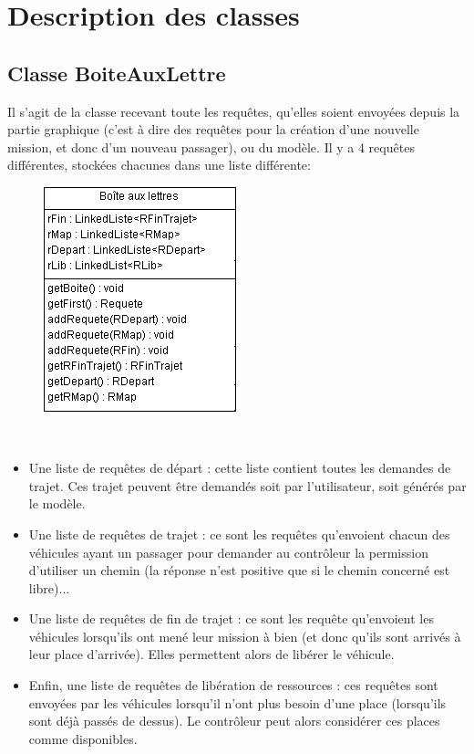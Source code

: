 \documentclass[a4paper, titlepage]{report}
\begin{document}
\chapter{Description des classes}
\section{Classe BoiteAuxLettre}
     
      Il s'agit de la classe recevant toute les requêtes, qu'elles soient envoyées depuis la partie graphique (c'est à dire des requêtes pour la création d'une nouvelle mission, et donc d'un nouveau passager), ou du modèle. Il y a 4 requêtes différentes, stockées chacunes dans une liste différente:
      \begin{figure}
\includegraphics[scale=1]{Images/boite.png}
\end{figure} \\  
      \begin{itemize}
      \item Une liste de requêtes de départ : cette liste contient toutes les demandes de trajet. Ces trajet peuvent être demandés soit par l'utilisateur, soit générés par le modèle.
      \item Une liste de requêtes de trajet : ce sont les requêtes qu'envoient chacun des véhicules ayant un passager pour demander au contrôleur la permission d'utiliser un chemin (la réponse n'est positive que si le chemin concerné est libre)...
      \item Une liste de requêtes de fin de trajet : ce sont les requête qu'envoient les véhicules lorsqu'ils ont mené leur mission à bien (et donc qu'ils sont arrivés à leur place d'arrivée). Elles permettent alors de libérer le véhicule.
      \item Enfin, une liste de requêtes de libération de ressources : ces requêtes sont envoyées par les véhicules lorsqu'il n'ont plus besoin d'une place (lorsqu'ils sont déjà passés de dessus). Le contrôleur peut alors considérer ces places comme disponibles.
      \end{itemize}
\end{document}
